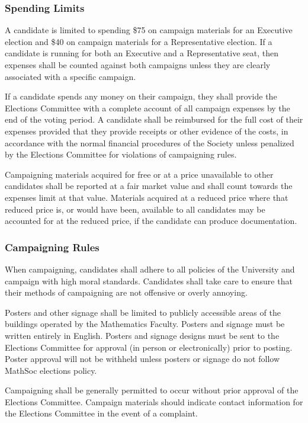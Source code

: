 \subsubsection{Spending Limits}
A candidate is limited to spending \$75 on campaign materials for an Executive election and \$40 on campaign materials for a Representative election.
If a candidate is running for both an Executive and a Representative seat, then expenses shall be counted against both campaigns unless they are clearly associated with a specific campaign.

If a candidate spends any money on their campaign, they shall provide the Elections Committee with a complete account of all campaign expenses by the end of the voting period.
A candidate shall be reimbursed for the full cost of their expenses provided that they provide receipts or other evidence of the costs, in accordance with the normal financial procedures of the Society unless penalized by the Elections Committee for violations of campaigning rules.

Campaigning materials acquired for free or at a price unavailable to other candidates shall be reported at a fair market value and shall count towards the expenses limit at that value.
Materials acquired at a reduced price where that reduced price is, or would have been, available to all candidates may be accounted for at the reduced price, if the candidate can produce documentation.

\subsubsection{Campaigning Rules}
When campaigning, candidates shall adhere to all policies of the University and campaign with high moral standards.
Candidates shall take care to ensure that their methods of campaigning are not offensive or overly annoying.

Posters and other signage shall be limited to publicly accessible areas of the buildings operated by the Mathematics Faculty. 
Posters and signage must be written entirely in English. 
Posters and signage designs must be sent to the Elections Committee for approval (in person or electronically) prior to posting. 
Poster approval will not be withheld unless posters or signage do not follow MathSoc elections policy.

Campaigning shall be generally permitted to occur without prior approval of the Elections Committee.
Campaign materials should indicate contact information for the Elections Committee in the event of a complaint.

